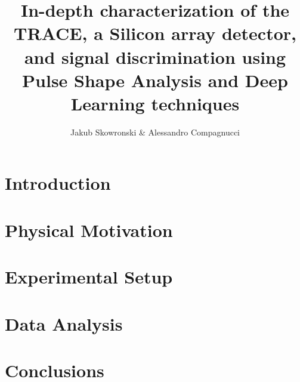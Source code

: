 \documentclass[a4paper, 11pt]{article}
\author{Jakub Skowronski \& Alessandro Compagnucci}
\title{In-depth characterization of the TRACE, a Silicon array detector, and signal discrimination using Pulse Shape Analysis and Deep Learning techniques}
\begin{document}
\maketitle

\clearpage

\tableofcontents

\clearpage

\section{Introduction}



\clearpage

\section{Physical Motivation}



\clearpage

\section{Experimental Setup}



\clearpage

\section{Data Analysis}





\clearpage

\section{Conclusions}



\clearpage


\end{document}
